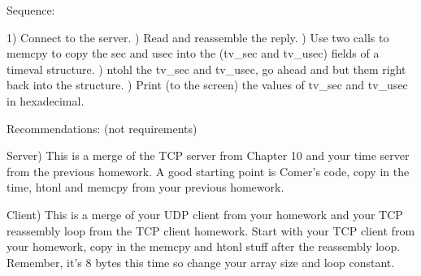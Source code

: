 Sequence:

1) Connect to the server.
\hfill{}) Read and reassemble the reply.
\hfill{}) Use two calls to {\ltt{}memcpy} to copy the sec and usec into
the ({\ltt{}tv_sec} and {\ltt{}tv_usec}) fields of a {\ltt{}timeval}
structure.
\hfill{}) ntohl the {\ltt{}tv_sec} and {\ltt{}tv_usec},
go ahead and but them right back into the structure.
\hfill{}) Print (to the screen) the values of
{\ltt{}tv_sec} and {\ltt{}tv_usec} in hexadecimal.

\bigskip
Recommendations: (not requirements)

Server)
This is a merge of the TCP server from Chapter 10
and your time server from the previous homework.
A good starting point is Comer's code,
copy in the time, htonl and memcpy from your previous homework.

Client) 
This is a merge of your UDP client from your homework
and your TCP reassembly loop from the TCP client homework.
Start with your TCP client from your homework, 
copy in the memcpy and htonl stuff after the
reassembly loop. Remember, it's 8 bytes this time
so change your array size and loop constant.
\bye
